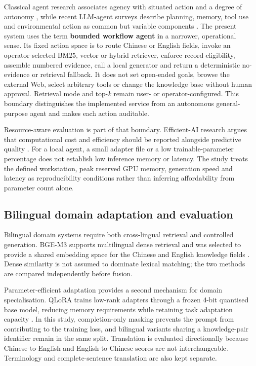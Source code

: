 Classical agent research associates agency with situated action and a degree of autonomy \citep{wooldridge1995agents}, while recent LLM-agent surveys describe planning, memory, tool use and environmental action as common but variable components \citep{xi2025agents}. The present system uses the term \textbf{bounded workflow agent} in a narrower, operational sense. Its fixed action space is to route Chinese or English fields, invoke an operator-selected BM25, vector or hybrid retriever, enforce record eligibility, assemble numbered evidence, call a local generator and return a deterministic no-evidence or retrieval fallback. It does not set open-ended goals, browse the external Web, select arbitrary tools or change the knowledge base without human approval. Retrieval mode and top-\emph{k} remain user- or operator-configured. This boundary distinguishes the implemented service from an autonomous general-purpose agent and makes each action auditable.

Resource-aware evaluation is part of that boundary. Efficient-AI research argues that computational cost and efficiency should be reported alongside predictive quality \citep{schwartz2020green}. For a local agent, a small adapter file or a low trainable-parameter percentage does not establish low inference memory or latency. The study treats the defined workstation, peak reserved GPU memory, generation speed and latency as reproducibility conditions rather than inferring affordability from parameter count alone.

\subsection{Bilingual domain adaptation and evaluation}

Bilingual domain systems require both cross-lingual retrieval and controlled generation. BGE-M3 supports multilingual dense retrieval and was selected to provide a shared embedding space for the Chinese and English knowledge fields \citep{chen2024bgem3}. Dense similarity is not assumed to dominate lexical matching; the two methods are compared independently before fusion.

Parameter-efficient adaptation provides a second mechanism for domain specialisation. QLoRA trains low-rank adapters through a frozen 4-bit quantised base model, reducing memory requirements while retaining task adaptation capacity \citep{dettmers2023qlora}. In this study, completion-only masking prevents the prompt from contributing to the training loss, and bilingual variants sharing a knowledge-pair identifier remain in the same split. Translation is evaluated directionally because Chinese-to-English and English-to-Chinese scores are not interchangeable. Terminology and complete-sentence translation are also kept separate.

